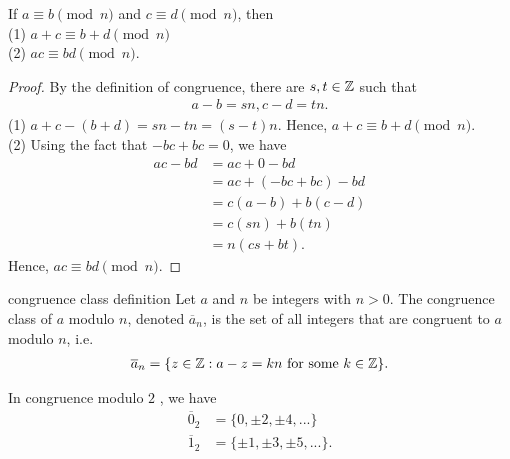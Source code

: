 \begin{theorem}{}{}
    If $a\equiv b\pmod n$ and $c\equiv d\pmod n$, then\\
    (1) $a+c\equiv b+d\pmod n$\\
    (2) $ac\equiv bd\pmod n$.
\end{theorem}
\begin{proof}
    By the definition of congruence, there are $s,t\in \mathbb{Z}$ such that 
    \begin{align*}
        a-b=sn,c-d=tn.
    \end{align*}
    (1) $a+c-(b+d)=sn-tn=(s-t)n$. Hence, $a+c\equiv b+d\pmod n$.\\
    (2) Using the fact that $-bc+bc=0$, we have
    \begin{align*}
        ac-bd &= ac+0-bd\\
              &= ac + (-bc+bc) - bd\\
              &= c(a-b) + b(c-d)\\
              &= c(sn) + b(tn)\\
              &= n(cs+bt).
    \end{align*}
    Hence, $ac\equiv bd\pmod n$.
\end{proof}

\begin{definition}{}{congruence class definition}
    Let $a$ and $n$ be integers with $n>0$. The congruence class of $a$ modulo $n$, denoted $\overline{a}_n$, 
    is the set of all integers that are congruent to $a$ modulo $n$, i.e.
    \begin{align*}
        \overline{a}_n=\{z\in\mathbb{Z}: a-z=kn \text{ for some }k\in\mathbb{Z}\}.
    \end{align*}  
\end{definition}
\begin{example}{}{}
    In congruence modulo $2$ , we have
    \begin{align*}
        \overline{0}_2&=\{0,\pm 2,\pm 4,...\}\\
        \overline{1}_2 &=\{\pm 1, \pm 3,\pm 5,...\}.
    \end{align*}
\end{example}

